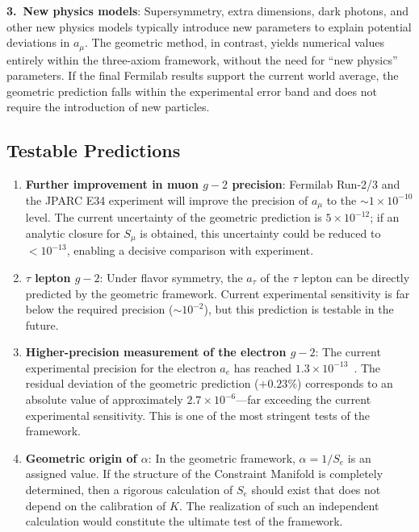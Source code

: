 \documentclass[aps,prd,reprint,nofootinbib]{revtex4-2}
\begin{document}
\textbf{3.\ New physics models}: Supersymmetry, extra dimensions, dark photons, and other new physics models typically introduce new parameters to explain potential deviations in $a_\mu$. The geometric method, in contrast, yields numerical values entirely within the three-axiom framework, without the need for ``new physics'' parameters. If the final Fermilab results support the current world average, the geometric prediction falls within the experimental error band and does not require the introduction of new particles.

\subsection{Testable Predictions}

\begin{enumerate}
\item \textbf{Further improvement in muon $g-2$ precision}: Fermilab Run-2/3 and the JPARC E34 experiment will improve the precision of $a_\mu$ to the $\sim 1 \times 10^{-10}$ level. The current uncertainty of the geometric prediction is $5 \times 10^{-12}$; if an analytic closure for $S_\mu$ is obtained, this uncertainty could be reduced to $< 10^{-13}$, enabling a decisive comparison with experiment.

\item \textbf{$\tau$ lepton $g-2$}: Under flavor symmetry, the $a_\tau$ of the $\tau$ lepton can be directly predicted by the geometric framework. Current experimental sensitivity is far below the required precision ($\sim 10^{-2}$), but this prediction is testable in the future.

\item \textbf{Higher-precision measurement of the electron $g-2$}: The current experimental precision for the electron $a_e$ has reached $1.3 \times 10^{-13}$~\cite{Hanneke2008,Fan2023}. The residual deviation of the geometric prediction ($+0.23\%$) corresponds to an absolute value of approximately $2.7 \times 10^{-6}$---far exceeding the current experimental sensitivity. This is one of the most stringent tests of the framework.

\item \textbf{Geometric origin of $\alpha$}: In the geometric framework, $\alpha = 1/S_e$ is an assigned value. If the structure of the Constraint Manifold is completely determined, then a rigorous calculation of $S_e$ should exist that does not depend on the calibration of $K$. The realization of such an independent calculation would constitute the ultimate test of the framework.
\end{enumerate}
\end{document}
